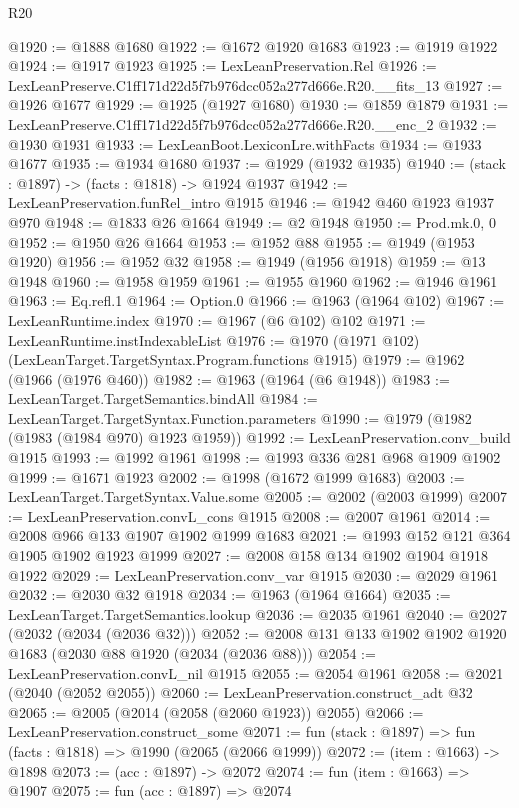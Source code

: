 \begin{lexlean}{R20}
\begin{coremodule}
@1920 := @1888 @1680
@1922 := @1672 @1920 @1683
@1923 := @1919 @1922
@1924 := @1917 @1923
@1925 := LexLeanPreservation.Rel
@1926 := LexLeanPreserve.C1ff171d22d5f7b976dcc052a277d666e.R20.__fits_13
@1927 := @1926 @1677
@1929 := @1925 (@1927 @1680)
@1930 := @1859 @1879
@1931 := LexLeanPreserve.C1ff171d22d5f7b976dcc052a277d666e.R20.__enc_2
@1932 := @1930 @1931
@1933 := LexLeanBoot.LexiconLre.withFacts
@1934 := @1933 @1677
@1935 := @1934 @1680
@1937 := @1929 (@1932 @1935)
@1940 := (stack : @1897) -> (facts : @1818) -> @1924 @1937
@1942 := LexLeanPreservation.funRel_intro @1915
@1946 := @1942 @460 @1923 @1937 @970
@1948 := @1833 @26 @1664
@1949 := @2 @1948
@1950 := Prod.mk.{0, 0}
@1952 := @1950 @26 @1664
@1953 := @1952 @88
@1955 := @1949 (@1953 @1920)
@1956 := @1952 @32
@1958 := @1949 (@1956 @1918)
@1959 := @13 @1948
@1960 := @1958 @1959
@1961 := @1955 @1960
@1962 := @1946 @1961
@1963 := Eq.refl.{1}
@1964 := Option.{0}
@1966 := @1963 (@1964 @102)
@1967 := LexLeanRuntime.index
@1970 := @1967 (@6 @102) @102
@1971 := LexLeanRuntime.instIndexableList
@1976 := @1970 (@1971 @102) (LexLeanTarget.TargetSyntax.Program.functions @1915)
@1979 := @1962 (@1966 (@1976 @460))
@1982 := @1963 (@1964 (@6 @1948))
@1983 := LexLeanTarget.TargetSemantics.bindAll
@1984 := LexLeanTarget.TargetSyntax.Function.parameters
@1990 := @1979 (@1982 (@1983 (@1984 @970) @1923 @1959))
@1992 := LexLeanPreservation.conv_build @1915
@1993 := @1992 @1961
@1998 := @1993 @336 @281 @968 @1909 @1902
@1999 := @1671 @1923
@2002 := @1998 (@1672 @1999 @1683)
@2003 := LexLeanTarget.TargetSyntax.Value.some
@2005 := @2002 (@2003 @1999)
@2007 := LexLeanPreservation.convL_cons @1915
@2008 := @2007 @1961
@2014 := @2008 @966 @133 @1907 @1902 @1999 @1683
@2021 := @1993 @152 @121 @364 @1905 @1902 @1923 @1999
@2027 := @2008 @158 @134 @1902 @1904 @1918 @1922
@2029 := LexLeanPreservation.conv_var @1915
@2030 := @2029 @1961
@2032 := @2030 @32 @1918
@2034 := @1963 (@1964 @1664)
@2035 := LexLeanTarget.TargetSemantics.lookup
@2036 := @2035 @1961
@2040 := @2027 (@2032 (@2034 (@2036 @32)))
@2052 := @2008 @131 @133 @1902 @1902 @1920 @1683 (@2030 @88 @1920 (@2034 (@2036 @88)))
@2054 := LexLeanPreservation.convL_nil @1915
@2055 := @2054 @1961
@2058 := @2021 (@2040 (@2052 @2055))
@2060 := LexLeanPreservation.construct_adt @32
@2065 := @2005 (@2014 (@2058 (@2060 @1923)) @2055)
@2066 := LexLeanPreservation.construct_some
@2071 := fun (stack : @1897) => fun (facts : @1818) => @1990 (@2065 (@2066 @1999))
@2072 := (item : @1663) -> @1898
@2073 := (acc : @1897) -> @2072
@2074 := fun (item : @1663) => @1907
@2075 := fun (acc : @1897) => @2074

\end{coremodule}
\end{lexlean}
